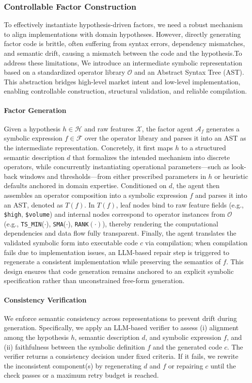 \subsubsection{Controllable Factor Construction}
To effectively instantiate hypothesis-driven factors, we need a robust mechanism to align implementations with domain hypotheses. However, directly generating factor code is brittle, often suffering from syntax errors, dependency mismatches, and semantic drift, causing a mismatch between the code and the hypothesis.To address these limitations, We introduce an intermediate symbolic representation based on a standardized operator library $\mathcal{O}$ and an Abstract Syntax Tree (AST). This abstraction bridges high-level market intent and low-level implementation, enabling controllable construction, structural validation, and reliable compilation.
\paragraph{Factor Generation} Given a hypothesis $h \in \mathcal{H}$ and raw features $\mathcal{X}$, the factor agent $\mathcal{A}_{f}$ generates a symbolic expression $f \in \mathcal{F}$ over the operator library and parses it into an AST as the intermediate representation. Concretely, it first maps $h$ to a structured semantic description $d$ that formalizes the intended mechanism into discrete operators, while concurrently instantiating operational parameters—such as look-back windows and thresholds—from either prescribed parameters in $h$ or heuristic defaults anchored in domain expertise.
Conditioned on $d$, the agent then assembles an operator composition into a symbolic expression $f$ and parses it into an AST, denoted as $T(f)$. In $T(f)$, leaf nodes bind to raw feature fields (e.g., \texttt{\$high}, \texttt{\$volume}) and internal nodes correspond to operator instances from $\mathcal{O}$ (e.g., \texttt{TS\_MIN}($\cdot$), \texttt{SMA}($\cdot$), \texttt{RANK}$(\cdot)$), thereby rendering the computational dependencies and data flow fully transparent.
Finally, the agent translates the validated symbolic form into executable code $c$ via compilation; when compilation fails due to implementation issues, an LLM-based repair step is triggered to regenerate a consistent implementation while preserving the semantics of $f$. This design ensures that code generation remains anchored to an explicit symbolic specification rather than unconstrained free-form generation.
\paragraph{Consistency Verification} We enforce semantic consistency across representations to prevent drift during generation. Specifically, we apply an LLM-based verifier to assess (i) alignment among the hypothesis $h$, semantic description $d$, and symbolic expression $f$, and (ii) faithfulness between the symbolic definition $f$ and the generated code $c$. The verifier returns a consistency decision under fixed criteria. If it fails, we rewrite the inconsistent component(s) by regenerating $d$ and $f$ or repairing $c$ until the check passes or a maximum retry budget is reached.
